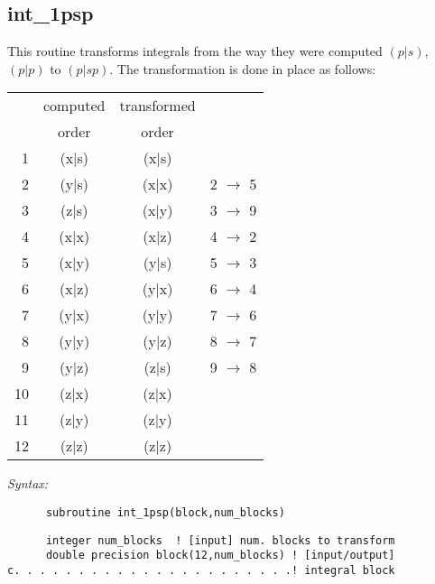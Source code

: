 \subsection{int\_1psp} 
This routine transforms integrals from the way they 
were computed $(p|s)$, $(p|p)$ to $(p|sp)$. 
The transformation is done in place as follows: 
\begin{tabular}{rccc} 
 & computed & transformed & \\ 
 &  order   &   order     & \\ 
~1 & (x$|$s)  &  (x$|$s)  & \\ 
~2 & (y$|$s)  &  (x$|$x)  & 2 $\rightarrow$ 5\\ 
~3 & (z$|$s)  &  (x$|$y)  & 3 $\rightarrow$ 9\\ 
~4 & (x$|$x)  &  (x$|$z)  & 4 $\rightarrow$ 2\\ 
~5 & (x$|$y)  &  (y$|$s)  & 5 $\rightarrow$ 3\\ 
~6 & (x$|$z)  &  (y$|$x)  & 6 $\rightarrow$ 4\\ 
~7 & (y$|$x)  &  (y$|$y)  & 7 $\rightarrow$ 6\\ 
~8 & (y$|$y)  &  (y$|$z)  & 8 $\rightarrow$ 7\\ 
~9 & (y$|$z)  &  (z$|$s)  & 9 $\rightarrow$ 8\\ 
10 & (z$|$x)  &  (z$|$x)  &  \\ 
11 & (z$|$y)  &  (z$|$y)  &  \\ 
12 & (z$|$z)  &  (z$|$z)  &  \\ 
\end{tabular} 
  
{\it Syntax:} 
\begin{verbatim} 
      subroutine int_1psp(block,num_blocks) 
\end{verbatim} 
\begin{verbatim} 
      integer num_blocks  ! [input] num. blocks to transform 
      double precision block(12,num_blocks) ! [input/output]  
c. . . . . . . . . . . . . . . . . . . . . .! integral block 
\end{verbatim} 
